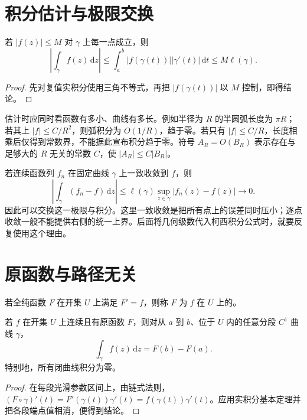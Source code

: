 \documentclass[UTF8,12pt,a4paper,fontset=fandol]{ctexbook}
\begin{document}
\section{积分估计与极限交换}

\begin{theorem}[长乘高估计]
\label{thm:cv-ml}
若 $|f(z)|\le M$ 对 $\gamma$ 上每一点成立，则
\begin{equation}
 \left|\int_\gamma f(z)\,\mathrm dz\right|
 \le\int_a^b|f(\gamma(t))||\gamma'(t)|\,\mathrm dt
 \le M\ell(\gamma).
 \label{eq:cv-ml}
\end{equation}
\end{theorem}
\begin{proof}
先对复值实积分使用三角不等式，再把 $|f(\gamma(t))|$ 以 $M$ 控制，即得结论。
\end{proof}

估计时应同时看函数有多小、曲线有多长。例如半径为 $R$ 的半圆弧长度为 $\pi R$；若其上 $|f|\le C/R^2$，则弧积分为 $O(1/R)$，趋于零。若只有 $|f|\le C/R$，长度相乘后仅得到常数界，不能据此宣布积分趋于零。符号 $A_R=O(B_R)$ 表示存在与足够大的 $R$ 无关的常数 $C$，使 $|A_R|\le C|B_R|$。

若连续函数列 $f_n$ 在固定曲线 $\gamma$ 上一致收敛到 $f$，则
\[
 \left|\int_\gamma(f_n-f)\,\mathrm dz\right|
 \le\ell(\gamma)\sup_{z\in\gamma}|f_n(z)-f(z)|\longrightarrow0.
\]
因此可以交换这一极限与积分。这里一致收敛是把所有点上的误差同时压小；逐点收敛一般不能提供右侧的统一上界。后面将几何级数代入柯西积分公式时，就要反复使用这个理由。

\section{原函数与路径无关}

\begin{definition}[原函数]
若全纯函数 $F$ 在开集 $U$ 上满足 $F'=f$，则称 $F$ 为 $f$ 在 $U$ 上的。
\end{definition}

\begin{theorem}[复积分的基本定理]
\label{thm:cv-fundamental}
若 $f$ 在开集 $U$ 上连续且有原函数 $F$，则对从 $a$ 到 $b$、位于 $U$ 内的任意分段 $C^1$ 曲线 $\gamma$，
\[
 \int_\gamma f(z)\,\mathrm dz=F(b)-F(a).
\]
特别地，所有闭曲线积分为零。
\end{theorem}
\begin{proof}
在每段光滑参数区间上，由链式法则，$(F\circ\gamma)'(t)=F'(\gamma(t))\gamma'(t)=f(\gamma(t))\gamma'(t)$。应用实积分基本定理并把各段端点值相消，便得到结论。
\end{proof}
\end{document}
